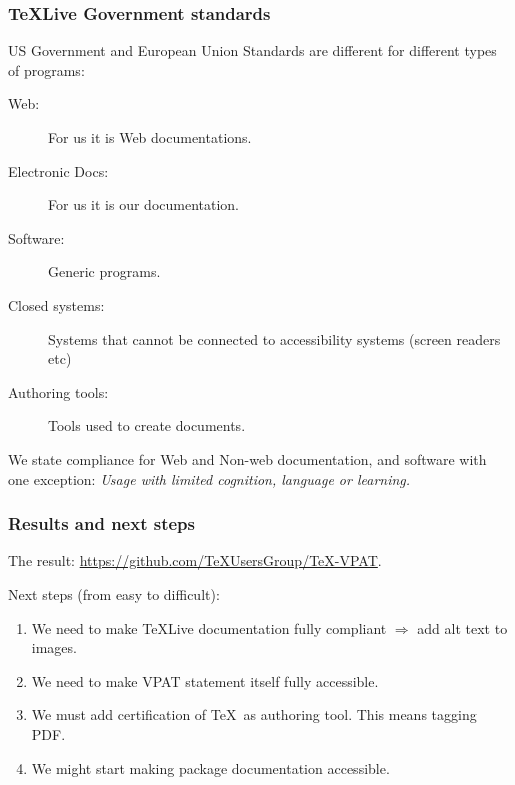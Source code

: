 \documentclass{beamer}
\begin{document}
\begin{frame}
  \frametitle{\TeX Live Government standards}

  US Government and European Union Standards are different for
  different types of programs:
  \begin{description}
  \item[Web:]  For us it is Web documentations.
  \item[Electronic Docs:] For us it is our documentation.
  \item[Software:] Generic programs.
  \item[Closed systems:] Systems that cannot be connected to
    accessibility systems (screen readers etc)
  \item[Authoring tools:] Tools used to create documents.  
  \end{description}

  We state compliance for Web and Non-web documentation, and software
  with one exception: \emph{Usage with limited cognition, language or
    learning.}  
  
\end{frame}

\begin{frame}
  \frametitle{Results and next steps}
  The result:  \url{https://github.com/TeXUsersGroup/TeX-VPAT}.

  Next steps (from easy to difficult):
  \begin{enumerate}
  \item We need to make \TeX Live documentation fully compliant
    $\Rightarrow$ add alt text to images.
  \item We need to make VPAT statement itself fully accessible.
  \item We must add certification of \TeX\ as authoring tool.  This
    means tagging PDF.
  \item We might start making package documentation accessible.  
  \end{enumerate}

\end{frame}
\end{document}
